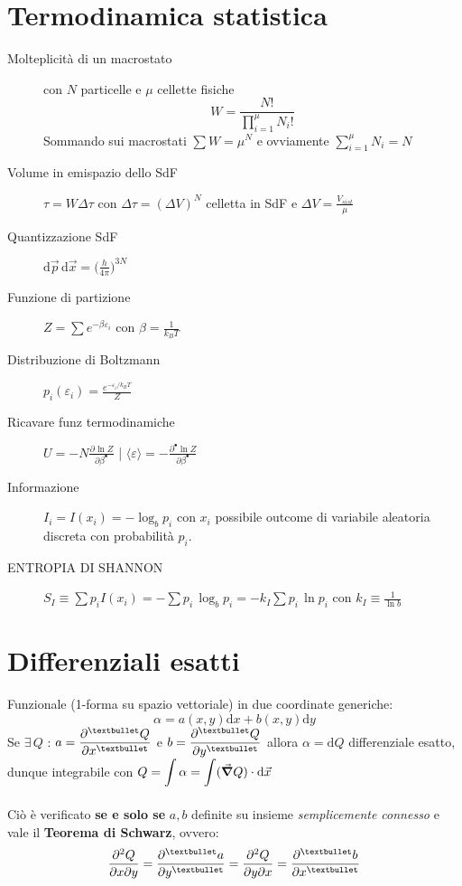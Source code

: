 \documentclass[10pt, oneside]{article}
\begin{document}
\section{Termodinamica statistica}
\begin{description}
\item[Molteplicità di un macrostato] con $N$ particelle e $\mu$ cellette fisiche
\[W = \frac{N!}{\displaystyle \prod_{i=1}^\mu N_i!}\]
Sommando sui macrostati $\displaystyle \sum W = \mu^N$ e ovviamente $\displaystyle \sum\limits_{i=1}^\mu N_i = N$
\item[Volume in emispazio dello SdF] $\displaystyle \tau = W \Delta \tau$ con $\Delta \tau = (\Delta V)^N$ celletta in SdF e $\displaystyle \Delta V = \frac{V_{sist}}{\mu}$
\item[Quantizzazione SdF] $\displaystyle \mathrm{d}\vec{p} \, \mathrm{d}\vec{x} = \big(\frac{h}{4\pi}\big)^{3N}$
\end{description}
\begin{description}
\item[Funzione di partizione] $\displaystyle Z = \sum e^{- \beta \varepsilon_i}$ con $\displaystyle \beta = \frac{1}{k_B T}$
\item[Distribuzione di Boltzmann] $\displaystyle p_i(\varepsilon_i) = \frac{e^{-\varepsilon_i/k_B T}}{Z}$
\item[Ricavare funz termodinamiche] $\displaystyle U = - N \frac{\partial^{} \ln Z}{\partial \beta^{•}}$ \bigg| $\displaystyle \langle \varepsilon \rangle = - \frac{\partial^{•} \ln Z}{\partial \beta^{•}}$
\item[Informazione] $\displaystyle I_i = I(x_i) = - \log_b p_i$ con $x_i$ possibile outcome di variabile aleatoria discreta con probabilità $p_i$.
\item[\large ENTROPIA DI SHANNON] $\displaystyle S_I \equiv \sum p_i I(x_i) = - \sum p_i \, \log_b p_i = - k_I \sum p_i \, \ln p_i$ con $\displaystyle k_I \equiv \frac{1}{\ln b}$
\end{description}

\section{Differenziali esatti}
Funzionale (1-forma su spazio vettoriale) in due coordinate generiche:
\[\alpha = a(x,y) \mathrm{d}x + b(x,y) \mathrm{d}y\]
Se $\exists \, Q$ : $\displaystyle a = \pdv[•]{Q}{x}$ e $\displaystyle b = \pdv[•]{Q}{y}$ allora $\alpha = \mathrm{d}Q$ differenziale esatto, dunque integrabile con $\displaystyle Q = \int \alpha = \int (\vec{\grad} Q) \cdot \mathrm{d}\vec{x}$
\\~\\Ciò è verificato \textbf{se e solo se} $a,b$ definite su insieme \textit{semplicemente connesso} e vale il \textbf{Teorema di Schwarz}, ovvero:
\[\pdv[]{Q}{x}{y} = \pdv[•]{a}{y} = \pdv[]{Q}{y}{x} = \pdv[•]{b}{x}\]
\newpage 
\end{document}
